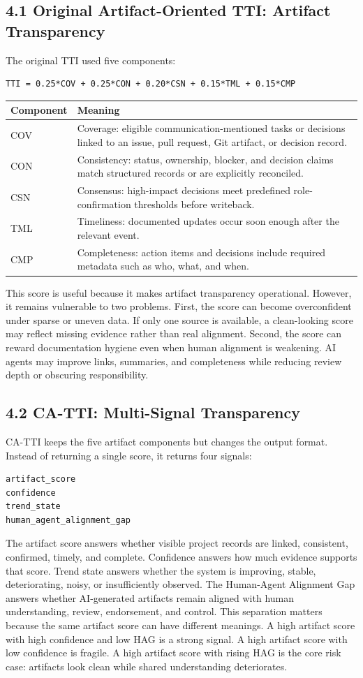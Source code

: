 \documentclass[11pt]{article}
\begin{document}
\subsection{4.1 Original Artifact-Oriented TTI: Artifact Transparency}
The original TTI used five components:
\begin{Verbatim}[fontsize=\small]
TTI = 0.25*COV + 0.25*CON + 0.20*CSN + 0.15*TML + 0.15*CMP
\end{Verbatim}
\begin{center}\small
\begin{tabularx}{\linewidth}{Y|Y}
\toprule
Component & Meaning \\
\midrule
COV & Coverage: eligible communication-mentioned tasks or decisions linked to an issue, pull request, Git artifact, or decision record. \\
CON & Consistency: status, ownership, blocker, and decision claims match structured records or are explicitly reconciled. \\
CSN & Consensus: high-impact decisions meet predefined role-confirmation thresholds before writeback. \\
TML & Timeliness: documented updates occur soon enough after the relevant event. \\
CMP & Completeness: action items and decisions include required metadata such as who, what, and when. \\
\bottomrule
\end{tabularx}
\end{center}
This score is useful because it makes artifact transparency operational. However, it remains vulnerable to two problems. First, the score can become overconfident under sparse or uneven data. If only one source is available, a clean-looking score may reflect missing evidence rather than real alignment. Second, the score can reward documentation hygiene even when human alignment is weakening. AI agents may improve links, summaries, and completeness while reducing review depth or obscuring responsibility.
\subsection{4.2 CA-TTI: Multi-Signal Transparency}
CA-TTI keeps the five artifact components but changes the output format. Instead of returning a single score, it returns four signals:
\begin{Verbatim}[fontsize=\small]
artifact_score
confidence
trend_state
human_agent_alignment_gap
\end{Verbatim}
The artifact score answers whether visible project records are linked, consistent, confirmed, timely, and complete. Confidence answers how much evidence supports that score. Trend state answers whether the system is improving, stable, deteriorating, noisy, or insufficiently observed. The Human-Agent Alignment Gap answers whether AI-generated artifacts remain aligned with human understanding, review, endorsement, and control.
This separation matters because the same artifact score can have different meanings. A high artifact score with high confidence and low HAG is a strong signal. A high artifact score with low confidence is fragile. A high artifact score with rising HAG is the core risk case: artifacts look clean while shared understanding deteriorates.
\end{document}
